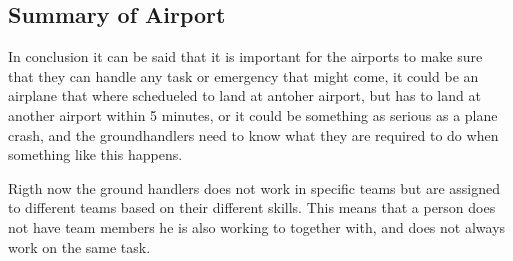 \subsection{Summary of Airport}

In conclusion it can be said that it is important for the airports to make sure that they can handle any task or emergency that might come, it could be an airplane that where schedueled to land at antoher airport, but has to land at another airport within 5 minutes, or it could be something as serious as a plane crash, and the groundhandlers need to know what they are required to do when something like this happens.

Rigth now the ground handlers does not work in specific teams but are assigned to different teams based on their different skills. This means that a person does not have team members he is also working to together with, and does not always work on the same task.